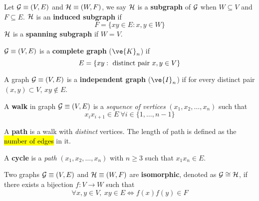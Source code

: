 \documentclass{article}
\begin{document}
		\begin{definition}
			Let $\mathcal{{G}} \equiv (V, E)$ and $\mathcal{{H}} \equiv (W, F)$, we say $\mathcal{{H}}$ is a \textbf{subgraph} of $\mathcal{{G}}$ when $W \subseteq V$ and $F \subseteq E$. $\mathcal{{H}}$ is an \textbf{induced subgraph} if
			\begin{equation}
				F = \{xy \in E: x, y \in W\}	
			\end{equation}
			$\mathcal{{H}}$ is a \textbf{spanning subgraph} if $W = V$.
		\end{definition}
		
		\begin{definition}
			$\mathcal{{G}} \equiv (V, E)$ is a \textbf{complete graph} ($\ve{K}_n$) if 
			\begin{equation}
				E = \{xy: \text{{ distinct pair }} x, y \in V\}
			\end{equation}
		\end{definition}
		
		\begin{definition}
			A graph $\mathcal{{G}} \equiv (V, E)$ is a \textbf{independent graph} ($\ve{I}_n$) if for every distinct pair $(x, y) \subset V$, $xy \notin E$.
		\end{definition}
		
		\begin{definition}
			A \textbf{walk} in graph $\mathcal{{G}} \equiv (V, E)$ is a \emph{sequence of vertices} $(x_1, x_2, \dots, x_n)$ such that 
			\begin{equation}
				x_ix_{i+1} \in E\  \forall i \in \{1,\dots,n-1\}
			\end{equation}
		\end{definition}
		
		\begin{definition}
			A \textbf{path} is a walk with \emph{distinct} vertices. The length of path is defined as the \hl{number of edges} in it.
		\end{definition}
		
		\begin{definition}
			A \textbf{cycle} is a \emph{path} $(x_1, x_2, \dots, x_n)$ with $n \geq 3$ such that $x_1x_n \in E$.
		\end{definition}
		
		\begin{definition}
			Two graphs $\mathcal{{G}} \equiv (V, E)$ and $\mathcal{{H}} \equiv (W, F)$ are \textbf{isomorphic}, denoted as $\mathcal{{G}} \cong \mathcal{{H}}$, if there exists a bijection $f: V \to W$ such that
			\begin{equation}
				\forall x, y \in V,\ xy \in E \iff f(x)f(y) \in F
			\end{equation}
		\end{definition}
		
\end{document}
